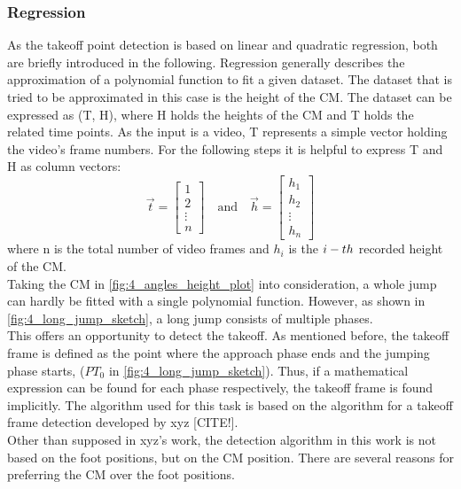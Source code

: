 \subsubsection{Regression}
As the takeoff point detection is based on linear and quadratic regression,
both are briefly introduced in the following.
Regression generally describes the approximation of a polynomial function to
fit a given dataset.
The dataset that is tried to be approximated in this case is the height of the
\ac{CM}.
The dataset can be expressed as (T, H), where H holds the heights of the
\ac{CM} and T holds the related time points.
As the input is a video, T represents a simple vector holding the
video's frame numbers.
For the following steps it is helpful to express T and H as column vectors:
\begin{equation}
    \vec{t} = \begin{bmatrix}
        1\\
        2\\
        \vdots\\
        n
    \end{bmatrix}
        \quad\text{and}\quad
    \vec{h} = \begin{bmatrix}
        h_1\\
        h_2\\
        \vdots\\
        h_n
    \end{bmatrix}
\end{equation}
where n is the total number of video frames and $h_i$ is the $i\--th$ recorded
height of the \ac{CM}.\\
Taking the \ac{CM} in \autoref{fig:4_angles_height_plot} into consideration,
a whole jump can hardly be fitted with a single polynomial function.
However, as shown in \autoref{fig:4_long_jump_sketch}, a long jump consists of
multiple phases.\\
This offers an opportunity to detect the takeoff.
As mentioned before, the takeoff frame is defined as the point where the
approach phase ends and the jumping phase starts, ($PT_0$ in
\autoref{fig:4_long_jump_sketch}).
Thus, if a mathematical expression can be found for each phase respectively,
the takeoff frame is found implicitly.
The algorithm used for this task is based on the algorithm for a takeoff
frame detection developed by xyz [CITE!].\\%
Other than supposed in xyz's work, the detection algorithm in this work is not
based on the foot positions, but on the \ac{CM} position.
There are several reasons for preferring the \ac{CM} over the foot positions.
